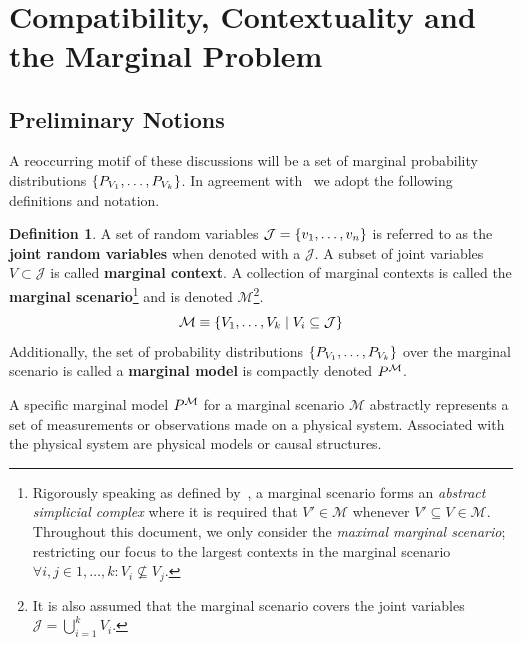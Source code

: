 \documentclass[aps, 10pt, english, twoside, pra, nofootinbib, longbibliography]{revtex4-1}
\theoremstyle{plain}
\theoremstyle{definition}
\newtheorem{definition}[theorem]{Definition}
\theoremstyle{remark}
\newcommand{\mscenario}{\mathcal{M}}
\newcommand{\jointvar}{\mathcal{J}}
\newcommand{\term}[1]{\textcolor{Mahogany}{\textbf{#1}}}
\begin{document}
     \\


    \section{Compatibility, Contextuality and the Marginal Problem}
    \label{sec:comp_con_mp}

    \subsection{Preliminary Notions}
    \label{eq:comp_con_mp_notions}
    A reoccurring motif of these discussions will be a set of marginal probability distributions $\bc{\prob[V_1], \ldots, \prob[V_k]}$. In agreement with~\cite{Fritz_2011} we adopt the following definitions and notation.

    \begin{definition}
        \label{def:marginal_model}
        A set of random variables $\jointvar = \bc{v_1, \ldots, v_n}$ is referred to as the \term{joint random variables} when denoted with a $\jointvar$. A subset of joint variables $V \subset \jointvar$ is called \term{marginal context}. A collection of marginal contexts is called the \term{marginal scenario}\footnote{Rigorously speaking as defined by~\cite{Fritz_2011}, a marginal scenario forms an \textit{abstract simplicial complex} where it is required that $V' \in \mscenario$ whenever $V' \subseteq V \in \mscenario$. Throughout this document, we only consider the \textit{maximal marginal scenario}; restricting our focus to the largest contexts in the marginal scenario $\forall i,j \in 1, \ldots, k: V_i \not \subseteq V_j$.} and is denoted $\mscenario$\footnote{It is also assumed that the marginal scenario covers the joint variables $\jointvar = \bigcup_{i = 1}^{k} V_i$.}.
        \[ \mscenario \defined \bc{V_1, \ldots, V_k \mid V_i \subseteq \jointvar} \]
        Additionally, the set of probability distributions $\bc{\prob[V_1], \ldots, \prob[V_k]}$ over the marginal scenario is called a \term{marginal model} is compactly denoted $\prob^{\mscenario}$.
    \end{definition}
    A specific marginal model $\prob^{\mscenario}$ for a marginal scenario $\mscenario$ abstractly represents a set of measurements or observations made on a physical system. Associated with the physical system are physical models or causal structures.
\end{document}
